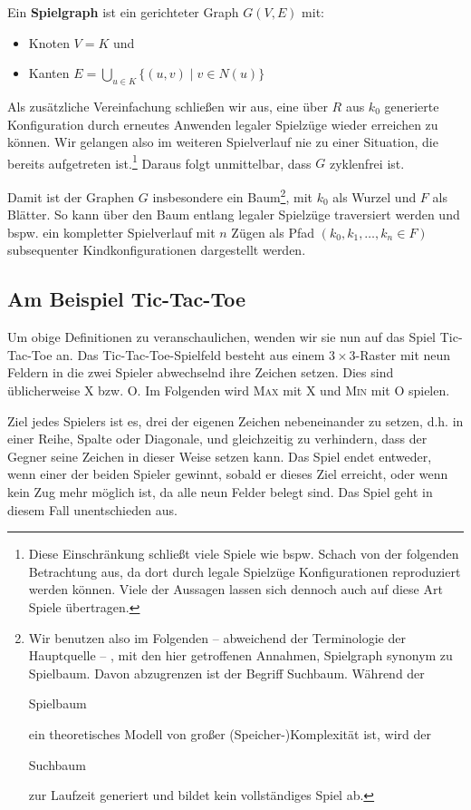 \documentclass[a4paper,twoside]{scrartcl}
\newcommand\e[1]{\begin{em}#1\end{em}}
\newcommand\q[1]{\glqq #1\grqq}
\begin{document}
Ein \textbf{Spielgraph} ist ein gerichteter Graph $G(V,E)$ mit: 
\begin{itemize}
	\item Knoten $V = K$ und
	\item Kanten $E = \bigcup\limits_{u \in K}\{(u,v) \mid v \in N(u)\}$
\end{itemize}

Als zusätzliche Vereinfachung schließen wir aus, eine über $R$ aus $k_0$ generierte Konfiguration durch erneutes Anwenden legaler Spielzüge wieder erreichen zu können. Wir gelangen also im weiteren Spielverlauf nie zu einer Situation, die bereits aufgetreten ist.\footnote{Diese Einschränkung schließt viele Spiele wie bspw. Schach von der folgenden Betrachtung aus, da dort durch legale Spielzüge Konfigurationen reproduziert werden können. Viele der Aussagen lassen sich dennoch auch auf diese Art Spiele übertragen.} Daraus folgt unmittelbar, dass $G$ zyklenfrei ist.

Damit ist der Graphen $G$ insbesondere ein Baum\footnote{\label{suchbaum}Wir benutzen also im Folgenden -- abweichend der Terminologie der Hauptquelle\cite{klueppel:2016} -- , mit den hier getroffenen Annahmen, \q{Spielgraph} synonym zu \q{Spielbaum}. Davon abzugrenzen ist der Begriff \q{Suchbaum}. Während der \e{Spielbaum} ein theoretisches Modell von großer (Speicher-)Komplexität ist, wird der \e{Suchbaum} zur Laufzeit generiert und bildet kein vollständiges Spiel ab.}, mit $k_0$ als Wurzel und $F$ als Blätter. So kann über den Baum entlang legaler Spielzüge traversiert werden und bspw. ein kompletter Spielverlauf mit $n$ Zügen als Pfad $(k_0, k_1, \dots, k_n \in F)$ subsequenter Kindkonfigurationen dargestellt werden.


\subsection{Am Beispiel Tic-Tac-Toe}

Um obige Definitionen zu veranschaulichen, wenden wir sie nun auf das Spiel Tic-Tac-Toe an. Das Tic-Tac-Toe-Spielfeld besteht aus einem $3 \times 3$-Raster mit neun Feldern in die zwei Spieler abwechselnd ihre Zeichen setzen. Dies sind üblicherweise \q{X} bzw. \q{O}. Im Folgenden wird \textsc{Max} mit \q{X} und \textsc{Min} mit \q{O} spielen.

Ziel jedes Spielers ist es, drei der eigenen Zeichen nebeneinander zu setzen, d.h. in einer Reihe, Spalte oder Diagonale, und gleichzeitig zu verhindern, dass der Gegner seine Zeichen in dieser Weise setzen kann. Das Spiel endet entweder, wenn einer der beiden Spieler gewinnt, sobald er dieses Ziel erreicht, oder wenn kein Zug mehr möglich ist, da alle neun Felder belegt sind. Das Spiel geht in diesem Fall unentschieden aus.
\end{document}

